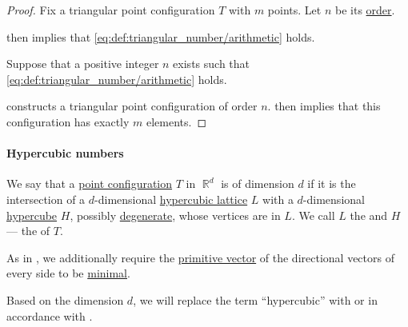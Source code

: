\begin{proof}
   Fix a triangular point configuration \( T \) with \( m \) points. Let \( n \) be its \hyperref[def:triangular_point_configuration_order]{order}.

   then implies that \eqref{eq:def:triangular_number/arithmetic} holds.

   Suppose that a positive integer \( n \) exists such that \eqref{eq:def:triangular_number/arithmetic} holds.

   constructs a triangular point configuration of order \( n \).  then implies that this configuration has exactly \( m \) elements.
\end{proof}

\paragraph{Hypercubic numbers}

\begin{definition}\label{def:hypercubic_point_configuration}\mimprovised
  We say that a \hyperref[def:point_configuration]{point configuration} \( T \) in \( \BbbR^d \) is  of dimension \( d \) if it is the intersection of a \( d \)-dimensional \hyperref[def:hypercubic_point_lattice]{hypercubic lattice} \( L \) with a \( d \)-dimensional \hyperref[def:hypercube]{hypercube} \( H \), possibly \hyperref[def:degenerate_polytope]{degenerate}, whose vertices are in \( L \). We call \( L \) the  and \( H \) --- the  of \( T \).

  As in , we additionally require the \hyperref[def:primitive_lattice_vector]{primitive vector} of the directional vectors of every side to be \hyperref[def:minimal_lattice_vector]{minimal}.

  Based on the dimension \( d \), we will replace the term \enquote{hypercubic} with  or  in accordance with .
\end{definition}

